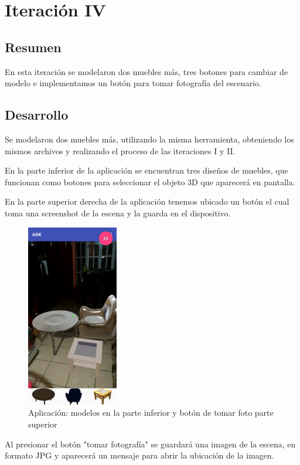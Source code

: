 \section{Iteración IV}
\subsection{Resumen}
En esta iteración se modelaron dos muebles más, tres botones para cambiar de modelo e implementamos un botón para tomar fotografía del escenario.
\subsection{Desarrollo}
Se modelaron dos muebles más, utilizando la misma herramienta, obteniendo los mismos archivos y realizando el proceso de las iteraciones I y II.

En la parte inferior de la aplicación se encuentran tres diseños de muebles, que funcionan como botones para seleccionar el objeto 3D que aparecerá en pantalla.

En la parte superior derecha de la aplicación tenemos ubicado un botón el cual toma una screenshot de la escena y la guarda en el dispositivo.

\begin{figure}[H]
	\centering
	\includegraphics[width=4cm,height=8cm]{imagenes/iteraciones/all.png}
	\caption{Aplicación: modelos en la parte inferior y botón de tomar foto parte superior}
	\label{fig:aplicacion}
\end{figure} 

Al presionar el botón "tomar fotografía" se guardará una imagen de la escena, en formato JPG y aparecerá un mensaje para abrir la ubicación de la imagen.  


